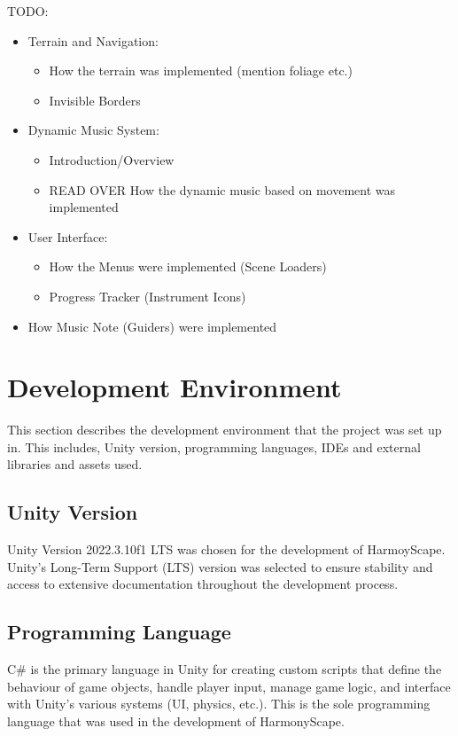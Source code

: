 \documentclass{l4proj}
\begin{document}
TODO:
\begin{itemize}
    \item Terrain and Navigation:
    \begin{itemize}
        \item How the terrain was implemented (mention foliage etc.)
        \item Invisible Borders
    \end{itemize}
    \item Dynamic Music System:
    \begin{itemize}
        \item Introduction/Overview
        \item READ OVER How the dynamic music based on movement was implemented
    \end{itemize}
    \item User Interface:
    \begin{itemize}
        \item How the Menus were implemented (Scene Loaders)
        \item Progress Tracker (Instrument Icons)
    \end{itemize}
    \item How Music Note (Guiders) were implemented
\end{itemize}

\newpage

\section{Development Environment}
This section describes the development environment that the project was set up in. This includes, Unity version, programming languages, IDEs and external libraries and assets used.

\subsection{Unity Version}
Unity Version 2022.3.10f1 LTS was chosen for the development of HarmoyScape. Unity's Long-Term Support (LTS) version was selected to ensure stability and access to extensive documentation throughout the development process.

\subsection{Programming Language}
C# is the primary language in Unity for creating custom scripts that define the behaviour of game objects, handle player input, manage game logic, and interface with Unity's various systems (UI, physics, etc.). This is the sole programming language that was used in the development of HarmonyScape.
\end{document}
